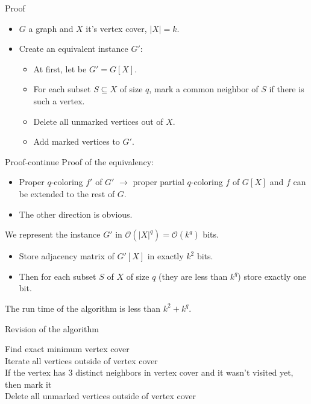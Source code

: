 \documentclass{beamer}
\begin{document}
\begin{frame}{Proof}
\begin{itemize}
\item $G$ a graph and $X$ it's vertex cover, $|X| = k$. 
\pause
\item Create an equivalent instance $G'$:
\pause
\begin{itemize}
\item At first, let be $G' = G[X]$. 
\pause
\item For each subset $S \subseteq X$ of size $q$, mark a common neighbor of $S$ if there is such a vertex.
\pause
\item Delete all unmarked vertices out of $X$. 
\pause
\item Add marked vertices to $G'$. 

\end{itemize}
\end{itemize}
\end{frame}

\begin{frame}{Proof-continue}
Proof of the equivalency: 
\pause
\begin{itemize}

\item Proper $q$-coloring $f'$ of $G'$ $\longrightarrow$ proper partial $q$-coloring $f$ of $G[X]$ 
and $f$ can be extended to the rest of $G$.
\pause
\item The other direction is obvious.


\end{itemize}
\pause
We represent the instance $G'$ in $\mathcal{O}(|X|^q) = \mathcal{O}(k^q)$ bits.
\pause
\begin{itemize}
\item Store adjacency matrix of $G'[X]$ in exactly $k^2$ bits. 
\pause
\item Then for each subset $S$ of $X$ of size $q$ (they are less than $k^q$) store exactly one bit. 
\end{itemize}
\pause
The run time of the algorithm is less than $k^2 + k^q$.
\end{frame}

\begin{frame}{Revision of the algorithm}

\begin{algorithm}[H]
\begin{algorithmic}[1]
\SetAlgoLined
\DontPrintSemicolon
  \caption{Kernelization of vertex coloring by using vertex cover}
\pause
\STATE Find exact minimum vertex cover\\
\pause
\STATE Iterate all vertices outside of vertex cover\\
\pause
\STATE If the vertex has $3$ distinct neighbors in vertex cover and it wasn't
visited yet, then mark it\\
\pause
\STATE Delete all unmarked vertices outside of vertex cover\\
\end{algorithmic}
\end{algorithm}
\end{frame}
\end{document}
